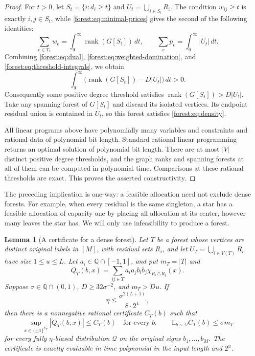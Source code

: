 \documentclass[letterpaper,11pt]{article}
\newtheorem{lemma}[theorem]{Lemma}
\theoremstyle{definition}
\newcommand{\E}{\mathbb E}
\DeclareMathOperator{\rank}{rank}
\begin{document}
\begin{proof}
For $t>0$, let $S_t=\{i:d_i\geq t\}$ and
$U_t=\bigcup_{i\in S_t}R_i$.  The condition $w_{ij}\geq t$ is exactly
$i,j\in S_t$, while \eqref{forest:eq:minimal-prices} gives the second
of the following identities:
\begin{equation}
 \sum_{e\in T_*}w_e
 =\int_0^\infty\rank(G[S_t])\,dt,
 \qquad
 \sum_vp_v=\int_0^\infty|U_t|\,dt.
 \label{forest:eq:threshold-integrals}
\end{equation}
Combining \eqref{forest:eq:dual},
\eqref{forest:eq:weighted-domination}, and
\eqref{forest:eq:threshold-integrals}, we obtain
\[
 \int_0^\infty\bigl(\rank(G[S_t])-D|U_t|\bigr)\,dt>0.
\]
Consequently some positive degree threshold satisfies
$\rank(G[S_t])>D|U_t|$.  Take any spanning forest of $G[S_t]$ and
discard its isolated vertices.  Its endpoint residual union is
contained in $U_t$, so this forest satisfies
\eqref{forest:eq:density}.

All linear programs above have polynomially many variables and
constraints and rational data of polynomial bit length.  Standard
rational linear programming returns an optimal solution of polynomial
bit length.  There are at most $|V|$ distinct positive degree
thresholds, and the graph ranks and spanning forests at all of them
can be computed in polynomial time.  Comparisons at these rational
thresholds are exact.  This proves the asserted constructivity.
\end{proof}

The preceding implication is one-way: a feasible allocation need not
exclude dense forests.  For example, when every residual is the same
singleton, a star has a feasible allocation of capacity one by placing
all allocation at its center, however many leaves the star has.  We
will only use infeasibility to produce a forest.

\begin{lemma}[A certificate for a dense forest]
\label{lem:forest-certificate}
Let $T$ be a forest whose vertices are distinct original labels in
$[M]$, with residual sets $R_i$, and let
$U_T=\bigcup_{i\in V(T)}R_i$ have size $1\leq u\leq L$.
Let $a_i\in\mathbb Q\cap[-1,1]$, and put $m_T=|T|$ and
\[
 Q_T(b,x)=\sum_{ij\in T}a_ia_jb_ib_j
             \chi_{R_i\triangle R_j}(x).
\]
Suppose $\sigma\in\mathbb Q\cap(0,1)$,
$D\geq32\sigma^{-2}$, and $m_T>Du$.  If
\begin{equation}
 \eta\leq\frac{\sigma^{2(L+1)}}{8\cdot2^L},
 \label{forest:eq:bias}
\end{equation}
then there is a nonnegative rational certificate $C_T(b)$ such that
\begin{equation}
 \sup_{x\in\{\pm1\}^{U_T}}|Q_T(b,x)|\leq C_T(b)
 \quad\text{for every }b,
 \qquad
 \E_{b\sim\mathcal Q}C_T(b)\leq\sigma m_T
 \label{forest:eq:certificate-guarantees}
\end{equation}
for every fully $\eta$-biased distribution $\mathcal Q$ on the
original signs $b_1,\ldots,b_M$.  The certificate is exactly evaluable
in time polynomial in the input length and $2^u$.
\end{lemma}
\end{document}
